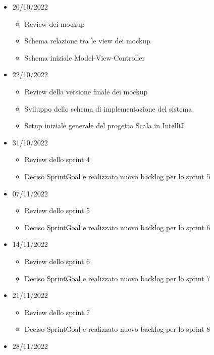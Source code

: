 \begin{itemize}
\begin{itemize}
        \end{itemize}
    \item 20/10/2022
        \begin{itemize}
            \item Review dei mockup
            \item Schema relazione tra le view dei mockup
            \item Schema iniziale Model-View-Controller
        \end{itemize}
    \item 22/10/2022
        \begin{itemize}
            \item Review della versione finale dei mockup
            \item Sviluppo dello schema di implementazione del sistema
            \item Setup iniziale generale del progetto Scala in IntelliJ
        \end{itemize}
    \item 31/10/2022
        \begin{itemize}
            \item Review dello sprint 4
            \item Deciso SprintGoal e realizzato nuovo backlog per lo sprint 5
        \end{itemize}
    \item 07/11/2022
        \begin{itemize}
            \item Review dello sprint 5
            \item Deciso SprintGoal e realizzato nuovo backlog per lo sprint 6
        \end{itemize}
    \item 14/11/2022
        \begin{itemize}
            \item Review dello sprint 6
            \item Deciso SprintGoal e realizzato nuovo backlog per lo sprint 7
        \end{itemize}
    \item 21/11/2022
        \begin{itemize}
            \item Review dello sprint 7
            \item Deciso SprintGoal e realizzato nuovo backlog per lo sprint 8
        \end{itemize}
    \item 28/11/2022

\end{itemize}
